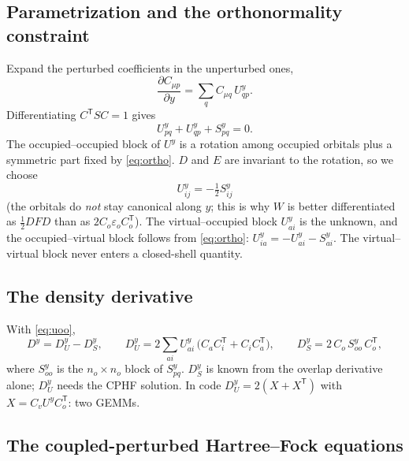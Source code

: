 \documentclass[11pt]{article}
\newcommand{\eps}{\varepsilon}
\newcommand{\Dsk}[1]{D_S^{#1}}
\begin{document}
\subsection{Parametrization and the orthonormality constraint}

Expand the perturbed coefficients in the unperturbed ones,
\begin{equation}
  \frac{\partial C_{\mu p}}{\partial y} = \sum_q C_{\mu q}\,U^y_{qp}.
\end{equation}
Differentiating $C^{\mathsf T} S C = 1$ gives
\begin{equation}
  U^y_{pq} + U^y_{qp} + S^y_{pq} = 0.
  \label{eq:ortho}
\end{equation}
The occupied--occupied block of $U^y$ is a rotation among occupied orbitals
plus a symmetric part fixed by \eqref{eq:ortho}. $D$ and $E$ are invariant
to the rotation, so we choose
\begin{equation}
  U^y_{ij} = -\tfrac12 S^y_{ij}
  \label{eq:uoo}
\end{equation}
(the orbitals do \emph{not} stay canonical along $y$; this is why $W$
is better differentiated as $\frac12 DFD$ than as $2C_o\eps_oC_o^{\mathsf T}$).
The virtual--occupied block $U^y_{ai}$ is the unknown, and the
occupied--virtual block follows from \eqref{eq:ortho}:
$U^y_{ia} = -U^y_{ai} - S^y_{ai}$. The virtual--virtual block never
enters a closed-shell quantity.

\subsection{The density derivative}

With \eqref{eq:uoo},
\begin{equation}
  D^y = D_U^y - \Dsk{y}, \qquad
  D_U^y = 2\sum_{ai} U^y_{ai}\,\bigl(C_a C_i^{\mathsf T} + C_i C_a^{\mathsf T}\bigr),
  \qquad
  \Dsk{y} = 2\,C_o\,S^y_{oo}\,C_o^{\mathsf T},
  \label{eq:dy}
\end{equation}
where $S^y_{oo}$ is the $n_o\times n_o$ block of $S^y_{pq}$. $\Dsk{y}$ is
known from the overlap derivative alone; $D_U^y$ needs the CPHF solution.
In code $D_U^y = 2(X + X^{\mathsf T})$ with $X = C_v U^y C_o^{\mathsf T}$:
two GEMMs.

\subsection{The coupled-perturbed Hartree--Fock equations}
\end{document}
